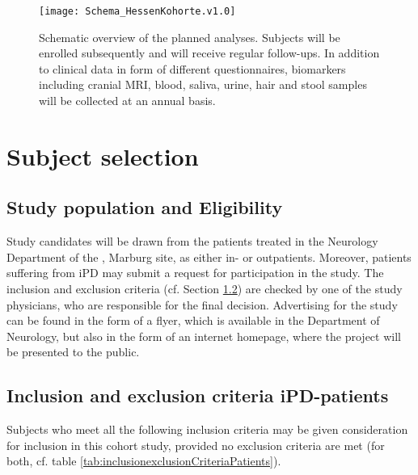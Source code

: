 \begin{figure}[h]
\label{fig2:scheme}
\centering
\texttt{[image: Schema\_HessenKohorte.v1.0]}
\caption{Schematic overview of the planned analyses. Subjects will be enrolled subsequently and will receive regular follow-ups. In addition to clinical data in form of different questionnaires, biomarkers including cranial \ac{MRI}, blood, saliva, urine, hair and stool samples will be collected at an annual basis.}
\end{figure}

\section{Subject selection}
\label{sec:study_selection}
\subsection{Study population and Eligibility}
\label{sec:study_population}
Study candidates will be drawn from the patients treated in the Neurology Department of the \UKGM, Marburg site, as either in- or outpatients. Moreover, patients suffering from \ac{iPD} may submit a request for participation in the study. The inclusion and exclusion criteria (cf. Section \ref{sec:inclusion_criteriaIPS}) are checked by one of the study physicians, who are responsible for the final decision. Advertising for the study can be found in the form of a flyer, which is available in the Department of Neurology, but also in the form of an internet homepage, where the project will be presented to the public.

\subsection{Inclusion and exclusion criteria \ac{iPD}-patients}
\label{sec:inclusion_criteriaIPS}
Subjects who meet all the following inclusion criteria may be given consideration for inclusion in this cohort study, provided no exclusion criteria are met (for both, cf. table \ref{tab:inclusionexclusionCriteriaPatients}).

